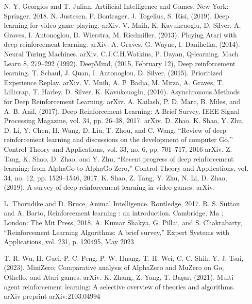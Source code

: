 \documentclass[conference]{IEEEtran}
\begin{document}
\begin{thebibliography}{00}
    
    
    
      N. Y. Georgios and T. Julian, Artificial Intelligence and Games. New York: Springer, 2018.
      N. Justesen, P. Bontrager, J. Togelius, S. Risi, (2019). Deep learning for video game playing. arXiv.
      V. Mnih, K. Kavukcuoglu, D. Silver, A. Graves, I. Antonoglou, D. Wierstra, M. Riedmiller, (2013). Playing Atari with deep reinforcement learning. arXiv.
      A. Graves, G. Wayne, I. Danihelka, (2014). Neural Turing Machines. arXiv.
      C.J.C.H.Watkins, P. Dayan, Q-learning. Mach Learn 8, 279–292 (1992).
      DeepMind, (2015, February 12), Deep reinforcement learning.
      T. Schaul, J. Quan, I. Antonoglou, D. Silver, (2015). Prioritized Experience Replay. arXiv.
      V. Mnih, A. P. Badia, M. Mirza, A. Graves, T. Lillicrap, T. Harley, D. Silver, K. Kavukcuoglu, (2016). Asynchronous Methods for Deep Reinforcement Learning. arXiv.
      A. Kailash, P. D. Marc, B. Miles, and A. B. Anil, (2017). Deep Reinforcement Learning: A Brief Survey. IEEE Signal Processing Magazine, vol. 34, pp. 26–38, 2017. arXiv.
     D. Zhao,  K. Shao, Y. Zhu, D. Li, Y. Chen, H. Wang, D. Liu, T. Zhou, and C. Wang, “Review of deep reinforcement learning and discussions on the development of computer Go,” Control Theory and Applications, vol. 33, no. 6, pp. 701–717, 2016 arXiv.
     Z. Tang, K. Shao, D. Zhao, and Y. Zhu, “Recent progress of deep reinforcement learning: from AlphaGo to AlphaGo Zero,” Control Theory and Applications, vol. 34, no. 12, pp. 1529–1546, 2017.
     K. Shao, Z. Tang, Y. Zhu, N. Li, D. Zhao, (2019). A survey of deep reinforcement learning in video games. arXiv.
    
     L. Thorndike and D. Bruce, Animal Intelligence. Routledge, 2017.
     R. S. Sutton and A. Barto, Reinforcement learning : an introduction. Cambridge, Ma ; London: The Mit Press, 2018.
     A. Kumar Shakya, G. Pillai, and S. Chakrabarty, “Reinforcement Learning Algorithms: A brief survey,” Expert Systems with Applications, vol. 231, p. 120495, May 2023
    
     T.-R. Wu, H. Guei, P.-C. Peng, P.-W. Huang, T. H. Wei, C.-C. Shih, Y.-J. Tsai, (2023). MiniZero: Comparative analysis of AlphaZero and MuZero on Go, Othello, and Atari games. arXiv.
     K. Zhang, Z. Yang, T. Ba\c{s}ar, (2021). Multi-agent reinforcement learning: A selective overview of theories and algorithms. arXiv preprint arXiv:2103.04994


\end{thebibliography}
\end{document}

